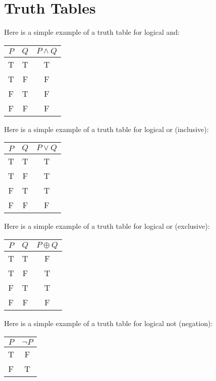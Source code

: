 \documentclass{report}
\begin{document}
    \section{Truth Tables}
    \bigbreak \noindent 
    Here is a simple example of a truth table for logical and:
    \bigbreak \noindent 
    \begin{center}
        \begin{tabular}{|c|c|c|}
            \hline
            $P$ & $Q$ & $P \land Q$ \\
            \hline
            T & T & T \\
            T & F & F \\
            F & T & F \\
            F & F & F \\
            \hline
        \end{tabular}
    \end{center}
    \bigbreak \noindent 
    Here is a simple example of a truth table for logical or (inclusive):
    \bigbreak \noindent 
    \begin{center}
        \begin{tabular}{|c|c|c|}
            \hline
            $P$ & $Q$ & $P \lor Q$ \\
            \hline
            T & T & T \\
            T & F & T \\
            F & T & T \\
            F & F & F \\
            \hline
        \end{tabular}
    \end{center}
    \bigbreak \noindent 
    Here is a simple example of a truth table for logical or (exclusive):
    \bigbreak \noindent 
    \begin{center}
        \begin{tabular}{|c|c|c|}
            \hline
            $P$ & $Q$ & $P \oplus Q$ \\
            \hline
            T & T & F \\
            T & F & T \\
            F & T & T \\
            F & F & F \\
            \hline
        \end{tabular}
    \end{center}
    \bigbreak \noindent 
    Here is a simple example of a truth table for logical not (negation):
    \begin{center}
        \begin{tabular}{|c|c|}
            \hline
            $P$ & $\lnot P$ \\
            \hline
            T & F \\
            F & T \\
            \hline
        \end{tabular}
    \end{center}
\end{document}
